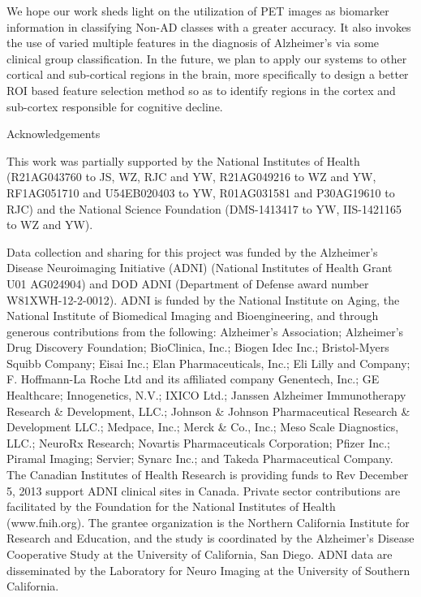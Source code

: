 \documentclass[authoryear,preprint,revi	ew,12pt]{elsarticle}
\begin{document}
We hope our work sheds light on the utilization of PET images as biomarker information in classifying Non-AD classes with a greater accuracy. It also invokes the use of varied multiple features in the diagnosis of Alzheimer's via some clinical group classification. In the future, we plan to apply our systems to other cortical and sub-cortical regions in the brain, more specifically to design a better ROI based feature selection method so as to identify regions in the cortex and sub-cortex responsible for cognitive decline.

\begin{center}
{\large Acknowledgements}
\end{center}

This work was partially supported by the National Institutes of Health (R21AG043760 to JS, WZ, RJC and YW, R21AG049216 to WZ and YW, RF1AG051710 and U54EB020403 to YW, R01AG031581 and P30AG19610 to RJC) and the National Science Foundation (DMS-1413417 to YW, IIS-1421165 to WZ and YW).

Data collection and sharing for this project was funded by the Alzheimer\textquoteright s Disease Neuroimaging Initiative (ADNI) (National Institutes of Health Grant U01 AG024904) and DOD ADNI (Department of Defense award number W81XWH-12-2-0012). ADNI is funded by the National Institute on Aging, the National Institute of Biomedical Imaging and Bioengineering, and through generous contributions from the following: Alzheimer's Association; Alzheimer\textquoteright s Drug Discovery Foundation; BioClinica, Inc.; Biogen Idec Inc.; Bristol-Myers Squibb Company; Eisai Inc.; Elan Pharmaceuticals, Inc.; Eli Lilly and Company; F. Hoffmann-La Roche Ltd and its affiliated company Genentech, Inc.; GE Healthcare; Innogenetics, N.V.; IXICO Ltd.; Janssen Alzheimer Immunotherapy Research \& Development, LLC.; Johnson \& Johnson Pharmaceutical Research \& Development LLC.; Medpace, Inc.; Merck \& Co., Inc.; Meso Scale Diagnostics, LLC.; NeuroRx Research; Novartis Pharmaceuticals Corporation; Pfizer Inc.; Piramal Imaging; Servier; Synarc Inc.; and Takeda Pharmaceutical Company. The Canadian Institutes of Health Research is providing funds to Rev December 5, 2013
support ADNI clinical sites in Canada. Private sector contributions are facilitated by the Foundation for the National Institutes of Health (www.fnih.org). The grantee organization is the Northern California Institute for Research and Education, and the study is coordinated by the Alzheimer\textquoteright s Disease Cooperative Study at the University of California, San Diego. ADNI data are disseminated by the Laboratory for Neuro Imaging at the University of Southern California.
\end{document}
